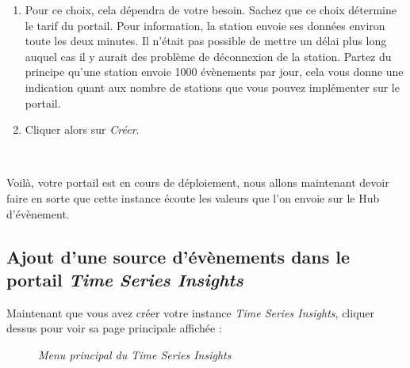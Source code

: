 \begin{enumerate}
\begin{enumerate}
	\item Pour ce choix, cela dépendra de votre besoin. Sachez que ce choix détermine le tarif du portail. Pour information, la station envoie ses données environ toute les deux minutes. Il n'était pas possible de mettre un délai plus long auquel cas il y aurait des problème de déconnexion de la station. Partez du principe qu'une station envoie 1000 évènements par jour, cela vous donne une indication quant aux nombre de stations que vous pouvez implémenter sur le portail.
	\item Cliquer alors sur \textit{Créer}.
	
\end{enumerate} \\
\end{enumerate}

Voilà, votre portail est en cours de déploiement, nous allons maintenant devoir faire en sorte que cette instance écoute les valeurs que l'on envoie sur le Hub d'évènement.

\subsection{Ajout d'une source d'évènements dans le portail \textit{Time Series Insights}}

Maintenant que vous avez créer votre instance \textit{Time Series Insights}, cliquer dessus pour voir sa page principale affichée :\\

\begin{figure}[H]
\begin{center}
\end{center}
	\caption{ \textit{Menu principal du \textit{Time Series Insights}}}
\end{figure}\\

